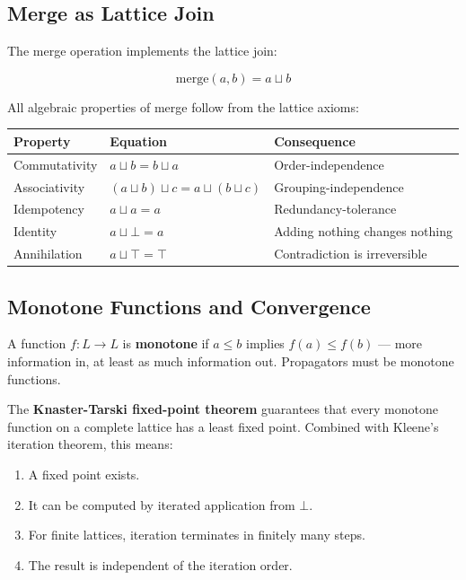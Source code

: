 \documentclass[11pt]{article}
\begin{document}
\subsection{Merge as Lattice Join}
\label{sec:org3046f89}

The merge operation implements the lattice join:

$$\text{merge}(a, b) = a \sqcup b$$

All algebraic properties of merge follow from the lattice axioms:

\begin{center}
\begin{tabular}{lll}
Property & Equation & Consequence\\
\hline
Commutativity & \(a \sqcup b = b \sqcup a\) & Order-independence\\
Associativity & \((a \sqcup b) \sqcup c = a \sqcup (b \sqcup c)\) & Grouping-independence\\
Idempotency & \(a \sqcup a = a\) & Redundancy-tolerance\\
Identity & \(a \sqcup \bot = a\) & Adding nothing changes nothing\\
Annihilation & \(a \sqcup \top = \top\) & Contradiction is irreversible\\
\end{tabular}
\end{center}
\subsection{Monotone Functions and Convergence}
\label{sec:orgf7abde4}

A function \(f : L \to L\) is \textbf{monotone} if \(a \leq b\) implies \(f(a) \leq
f(b)\) --- more information in, at least as much information out.
Propagators must be monotone functions.

The \textbf{Knaster-Tarski fixed-point theorem} guarantees that every monotone
function on a complete lattice has a least fixed point. Combined with
Kleene's iteration theorem, this means:

\begin{enumerate}
\item A fixed point exists.
\item It can be computed by iterated application from \(\bot\).
\item For finite lattices, iteration terminates in finitely many steps.
\item The result is independent of the iteration order.
\end{enumerate}
\end{document}
